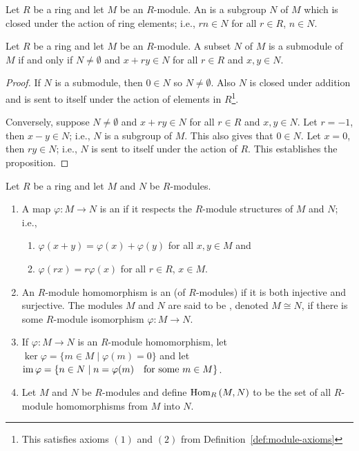     \begin{definition}\label{def:submodule}
        Let $R$ be a ring and let $M$ be an $R$-module. An  is a subgroup $N$ of $M$ which is closed under the action of ring elements; i.e., $rn \in N$ for all $r \in R$, $n \in N$.
    \end{definition}

    \begin{proposition}\label{prop:submodule-criterion}
        Let $R$ be a ring and let $M$ be an $R$-module. A subset $N$ of $M$ is a submodule of $M$ if and only if $N \neq \emptyset$ and $x+ry \in N$ for all $r \in R$ and $x,y \in N$.
    \end{proposition}
        \begin{proof}
            If $N$ is a submodule, then $0 \in N$  so $N \neq \emptyset$. Also $N$ is closed under addition and is sent to itself under the action of elements in $R$\footnote{This satisfies axioms $(1)$ and $(2)$ from Definition~\ref{def:module-axioms}}.  

            Conversely, suppose $N \neq \emptyset$ and $x+ry \in N$ for all $r \in R$ and $x,y \in N$. Let $r = -1$, then $x-y \in N$; i.e., $N$ is a subgroup of $M$. This also gives that $0 \in N$. Let $x = 0$, then $ry \in N$; i.e., $N$ is sent to itself under the action of $R$. This establishes the proposition.
        \end{proof}

    \begin{definition}\label{def:module-homomorphism}
        Let $R$ be a ring and let $M$ and $N$ be $R$-modules.
        \begin{enumerate}[label=(\arabic*)]
            \item A map $\varphi:M \rightarrow N$ is an  if it respects the $R$-module structures of $M$ and $N$; i.e.,
            \begin{enumerate}[label=(\alph*)]
                \item $\varphi(x+y) = \varphi(x) + \varphi(y)$ for all $x,y \in M$ and
                \item $\varphi(rx) = r\varphi(x)$ for all $r \in R$, $x \in M$.
            \end{enumerate}
            \item An $R$-module homomorphism is an  (of $R$-modules) if it is both injective and surjective. The modules $M$ and $N$ are said to be , denoted $M \cong N$, if there is some $R$-module isomorphism $\varphi:M \rightarrow N$.
            \item If $\varphi:M\rightarrow N$ is an $R$-module homomorphism, let $\ker{\varphi} = \{m \in M \mid \varphi(m) = 0\}$ and let $\operatorname{im}{\varphi}=\{n \in N \mid n = \varphi(m)\quad\text{for some $m \in M$}\}$.
            \item Let $M$ and $N$ be $R$-modules and define $\operatorname{Hom}_R{(M,N)}$ to be the set of all $R$-module homomorphisms from $M$ into $N$.
        \end{enumerate}
    \end{definition}

